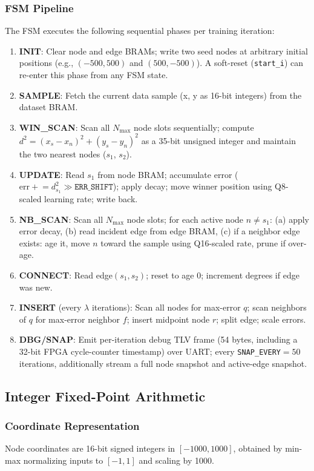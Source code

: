 \documentclass[conference]{IEEEtran}
\begin{document}
\subsubsection{FSM Pipeline}
The FSM executes the following sequential phases per training iteration:
\begin{enumerate}
  \item \textbf{INIT}: Clear node and edge BRAMs; write two seed nodes at arbitrary initial positions (e.g., $(-500, 500)$ and $(500, -500)$). A soft-reset (\texttt{start\_i}) can re-enter this phase from any FSM state.
  \item \textbf{SAMPLE}: Fetch the current data sample (x, y as 16-bit integers) from the dataset BRAM.
  \item \textbf{WIN\_SCAN}: Scan all $N_{\max}$ node slots sequentially; compute $d^2 = (x_s - x_n)^2 + (y_s - y_n)^2$ as a 35-bit unsigned integer and maintain the two nearest nodes ($s_1$, $s_2$).
  \item \textbf{UPDATE}: Read $s_1$ from node BRAM; accumulate error ($\mathrm{err} \mathrel{+}= d^2_{s_1} \gg \texttt{ERR\_SHIFT}$); apply decay; move winner position using Q8-scaled learning rate; write back.
  \item \textbf{NB\_SCAN}: Scan all $N_{\max}$ node slots; for each active node $n \neq s_1$: (a) apply error decay, (b) read incident edge from edge BRAM, (c) if a neighbor edge exists: age it, move $n$ toward the sample using Q16-scaled rate, prune if over-age.
  \item \textbf{CONNECT}: Read edge$(s_1, s_2)$; reset to age 0; increment degrees if edge was new.
  \item \textbf{INSERT} (every $\lambda$ iterations): Scan all nodes for max-error $q$; scan neighbors of $q$ for max-error neighbor $f$; insert midpoint node $r$; split edge; scale errors.
  \item \textbf{DBG/SNAP}: Emit per-iteration debug TLV frame (54 bytes, including a 32-bit FPGA cycle-counter timestamp) over UART; every \texttt{SNAP\_EVERY}$=50$ iterations, additionally stream a full node snapshot and active-edge snapshot.
\end{enumerate}

\subsection{Integer Fixed-Point Arithmetic}
\label{sec:arith}

\subsubsection{Coordinate Representation}
Node coordinates are 16-bit signed integers in $[-1000, 1000]$, obtained by min-max normalizing inputs to $[-1, 1]$ and scaling by 1000.
\end{document}
